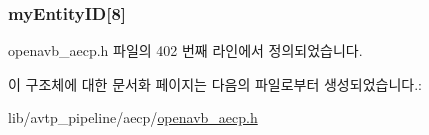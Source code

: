 \subsubsection[{\texorpdfstring{my\+Entity\+ID}{myEntityID}}]{ my\+Entity\+ID\mbox{[}8\mbox{]}}\hypertarget{structopenavb__aecp__sm__global__vars__t_a52cd07952946e6772a284dd030d97afd}{}\label{structopenavb__aecp__sm__global__vars__t_a52cd07952946e6772a284dd030d97afd}


openavb\+\_\+aecp.\+h 파일의 402 번째 라인에서 정의되었습니다.



이 구조체에 대한 문서화 페이지는 다음의 파일로부터 생성되었습니다.\+:\begin{DoxyCompactItemize}
\item 
lib/avtp\+\_\+pipeline/aecp/\hyperlink{openavb__aecp_8h}{openavb\+\_\+aecp.\+h}\end{DoxyCompactItemize}
